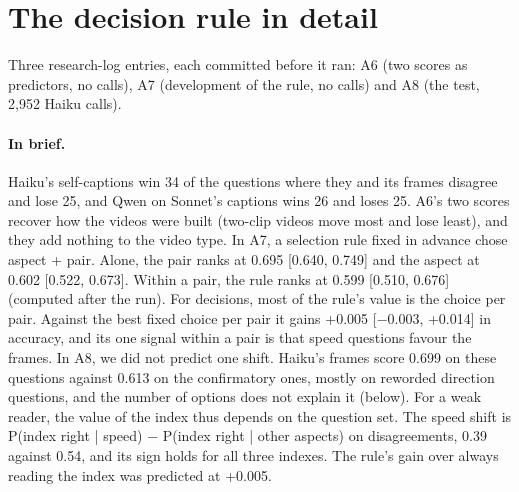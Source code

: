 \documentclass[11pt]{article}
\begin{document}
\section{The decision rule in detail}
\label{app:decide}

Three research-log entries, each committed before it ran: A6 (two scores as predictors, no calls), A7 (development of the rule, no calls) and A8 (the test, 2,952 Haiku calls).

\paragraph{In brief.} Haiku's self-captions win 34 of the questions where they and its frames disagree and lose 25, and Qwen on Sonnet's captions wins 26 and loses 25. A6's two scores recover how the videos were built (two-clip videos move most and lose least), and they add nothing to the video type. In A7, a selection rule fixed in advance chose aspect + pair. Alone, the pair ranks at 0.695 [0.640, 0.749] and the aspect at 0.602 [0.522, 0.673]. Within a pair, the rule ranks at 0.599 [0.510, 0.676] (computed after the run). For decisions, most of the rule's value is the choice per pair. Against the best fixed choice per pair it gains +0.005 [−0.003, +0.014] in accuracy, and its one signal within a pair is that speed questions favour the frames. In A8, we did not predict one shift. Haiku's frames score 0.699 on these questions against 0.613 on the confirmatory ones, mostly on reworded direction questions, and the number of options does not explain it (below). For a weak reader, the value of the index thus depends on the question set. The speed shift is P(index right | speed) − P(index right | other aspects) on disagreements, 0.39 against 0.54, and its sign holds for all three indexes. The rule's gain over always reading the index was predicted at +0.005.
\end{document}
